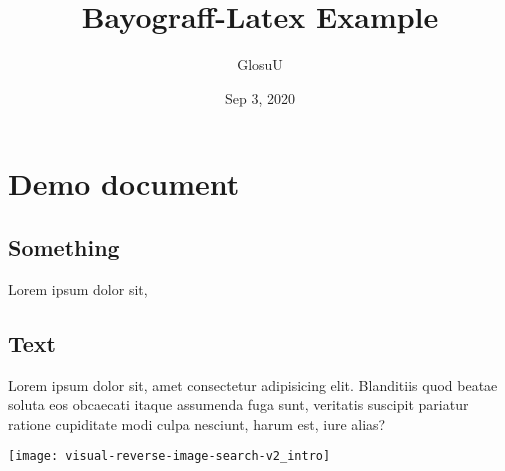 \documentclass[12pt, a4paper]{article}
\author{GlosuU}
\title{Bayograff-Latex Example}
\date{Sep 3, 2020}
\begin{document}
\maketitle
\tableofcontents
\section{Demo document}

\subsection{Something}
Lorem ipsum dolor sit,

\subsection{Text}
Lorem ipsum dolor sit, amet consectetur adipisicing elit. Blanditiis quod beatae soluta eos obcaecati itaque assumenda fuga sunt, veritatis suscipit pariatur ratione cupiditate modi culpa nesciunt, harum est, iure alias?

\texttt{[image: visual-reverse-image-search-v2\_intro]}
\end{document}
